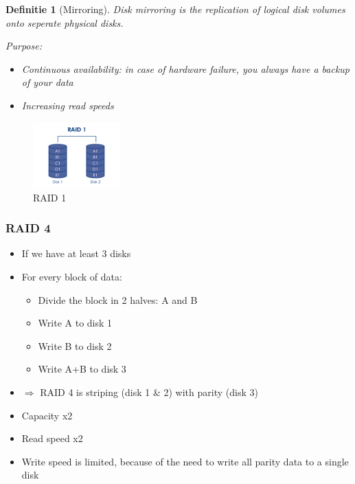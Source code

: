 \documentclass{article}
\newtheorem{theorem}{Definitie}[section]
\begin{document}
\begin{theorem}[Mirroring]
    Disk mirroring is the replication of logical disk volumes onto seperate physical disks.

    Purpose:

    \begin{itemize}
        \item Continuous availability: in case of hardware failure, you always have a backup of your data
        \item Increasing read speeds
    \end{itemize}
\end{theorem}

\begin{figure}[H]
    \centering
    \includegraphics[width=0.3\textwidth]{raid-mirroring.png}
    \caption{RAID 1}
\end{figure}


\subsubsection{RAID 4}

\begin{itemize}
    \item If we have at least 3 disks
    \item For every block of data:
    \begin{itemize}
        \item Divide the block in 2 halves: A and B
        \item Write A to disk 1
        \item Write B to disk 2
        \item Write A+B to disk 3
    \end{itemize}
    \item $\Rightarrow$ RAID 4 is striping (disk 1 \& 2) with parity (disk 3)
    \item Capacity x2
    \item Read speed x2
    \item Write speed is limited, because of the need to write all parity data to a single disk
\end{itemize}
\end{document}
